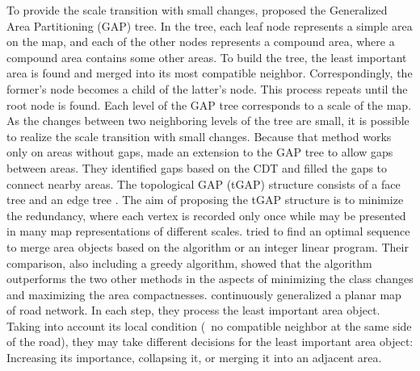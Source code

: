 \documentclass[twocolumn]{svjour3}          %
\begin{document}
To provide the scale transition with small changes, 
\citet{vanOosterom1995GAPTree} proposed 
the Generalized Area Partitioning (GAP) tree.
In the tree, each leaf node represents a simple area on the map,
and each of the other nodes represents a compound area,
where a compound area contains some other areas.
To build the tree, the least important area is found and 
merged into its most compatible neighbor.
Correspondingly, the former's node 
becomes a child of the latter's node.
This process repeats until the root node is found.
Each level of the GAP tree corresponds to a scale of the map.
As the changes between two neighboring levels of the tree are small,
it is possible to realize the scale transition with small changes.
Because that method works only on areas without gaps,
\citet{Ai2002GAP} made an extension to the GAP tree
to allow gaps between areas.
They identified gaps based on the CDT
and filled the gaps to connect nearby areas.
The topological GAP (tGAP) structure 
consists of a face tree and an edge tree \citep{vanOosterom2005}.
The aim of proposing the tGAP structure is to minimize the redundancy,
where each vertex is recorded only once 
while may be presented in many map representations of different scales.
\citet{Peng2020AreaAgg} tried to 
find an optimal sequence to merge area objects 
based on the \Astar algorithm or an integer linear program.
Their comparison, also including a greedy algorithm, showed that 
the \Astar algorithm outperforms the two other methods 
in the aspects of minimizing the class changes 
and maximizing the area compactnesses.
\citet{Suba2016Road} continuously generalized a planar map of road network.
In each step, they process the least important area object.
Taking into account its local condition
(\eg~no compatible neighbor at the same side of the road),
they may take different decisions for the least important area object: 
Increasing its importance, collapsing it, 
or merging it into an adjacent area.
\end{document}

